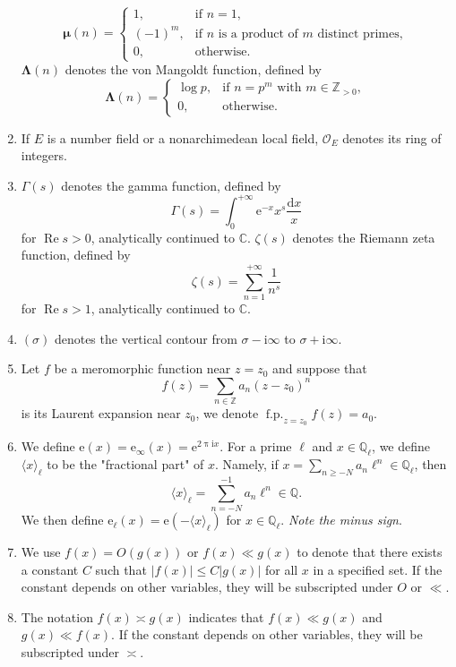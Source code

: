 \documentclass[10pt,oneside,reqno]{amsart}
\newcommand\rmd{\mathrm{d}}
\newcommand\rme{\mathrm{e}}
\newcommand\rmi{\mathrm{i}}
\newcommand\cO{\mathcal{O}}
\newcommand\CC{\mathbb{C}}
\newcommand\QQ{\mathbb{Q}}
\newcommand\ZZ{\mathbb{Z}}
\newcommand\dpii{2\uppi\rmi}
\renewcommand\Re{\mathop{\mathrm{Re}}}
\DeclareMathOperator\fp{f.p.}
\renewcommand\leq{\leqslant}
\renewcommand\geq{\geqslant}
\theoremstyle{THEOREM}
\theoremstyle{DEFINITION}
\theoremstyle{EXERCISE}
\numberwithin{equation}{section}
\begin{document}
\begin{enumerate}[itemsep=0pt,parsep=0pt,topsep=0pt,leftmargin=0pt,labelsep=3pt,itemindent=9pt,label=\textbullet]
  \[
  \bm{\mu}(n)=\begin{cases}
    1, & \text{if $n=1$}, \\
    (-1)^m, & \text{if $n$ is a product of $m$ distinct primes}, \\
    0, & \text{otherwise}.
  \end{cases}
  \]
  $\bm{\Lambda}(n)$ denotes the von Mangoldt function, defined by
  \[
  \bm{\Lambda}(n)=\begin{cases}
    \log p, & \text{if $n=p^m$ with $m\in \ZZ_{>0}$}, \\
    0, & \text{otherwise}.
  \end{cases}
  \]
 \item If $E$ is a number field or a nonarchimedean local field, $\cO_E$ denotes its ring of integers.
  \item $\Gamma(s)$ denotes the gamma function, defined by
  \[
  \Gamma(s)=\int_{0}^{+\infty}\rme^{-x}x^s\frac{\rmd x}{x}
  \]
  for $\Re s>0$, analytically continued to $\CC$. $\zeta(s)$ denotes the Riemann zeta function, defined by
  \[
    \zeta(s)=\sum_{n=1}^{+\infty}\frac{1}{n^s}
  \]
  for $\Re s>1$, analytically continued to $\CC$.
  \item $(\sigma)$ denotes the vertical contour from $\sigma-\rmi\infty$ to $\sigma+\rmi\infty$.
  \item Let $f$ be a meromorphic function near $z=z_0$ and suppose that 
  \[
  f(z)=\sum_{n\in \ZZ}a_n(z-z_0)^n
  \]
  is its Laurent expansion near $z_0$, we denote $\fp_{z=z_0}f(z)=a_0$.
  \item We define $\rme(x)=\rme_\infty(x)=\rme^{\dpii x}$. For a prime $\ell$ and $x\in \QQ_\ell$, we define $\langle x\rangle_\ell$ to be the "fractional part" of $x$. Namely, if $x=\sum_{n\geq -N}a_n\ell^n\in \QQ_\ell$, then 
      \[
      \langle x\rangle_\ell=\sum_{n=-N}^{-1}a_n\ell^n\in \QQ.
      \]
      We then define $\rme_\ell(x)=\rme(-\langle x\rangle_\ell)$ for $x\in \QQ_\ell$. \emph{Note the minus sign}.
  \item We use $f(x)=O(g(x))$ or $f(x)\ll g(x)$ to denote that there exists a constant $C$ such that $|f(x)|\leq C|g(x)|$ for all $x$ in a specified set. If the constant depends on other variables, they will be subscripted under $O$ or $\ll$.
  \item The notation $f(x)\asymp g(x)$ indicates that $f(x)\ll g(x)$ and $g(x)\ll f(x)$. If the constant depends on other variables, they will be subscripted under $\asymp$.
\end{enumerate}
\end{document}
